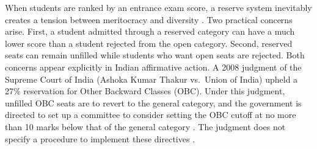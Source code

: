 \documentclass[a4paper,twoside]{article}
\theoremstyle{definition}
\begin{document}
When students are ranked by an entrance exam score, a reserve system inevitably
creates a tension between meritocracy and diversity \cite{imamura2025meritocracy}.
Two practical concerns arise.
First, a student admitted through a reserved category can have a much lower score than
a student rejected from the open category.
Second, reserved seats can remain unfilled while students who want open seats are
rejected.
Both concerns appear explicitly in Indian affirmative action.
A 2008 judgment of the Supreme Court of India (Ashoka Kumar Thakur vs.\ Union of India)
upheld a 27\% reservation for Other Backward Classes (OBC).
Under this judgment, unfilled OBC seats are to revert to the general category, and the
government is directed to set up a committee to consider setting the OBC cutoff at no
more than 10 marks below that of the general category
\cite{AyTu23a}.
The judgment does not specify a procedure to implement these directives
\cite{AyTu23a}.
\end{document}

